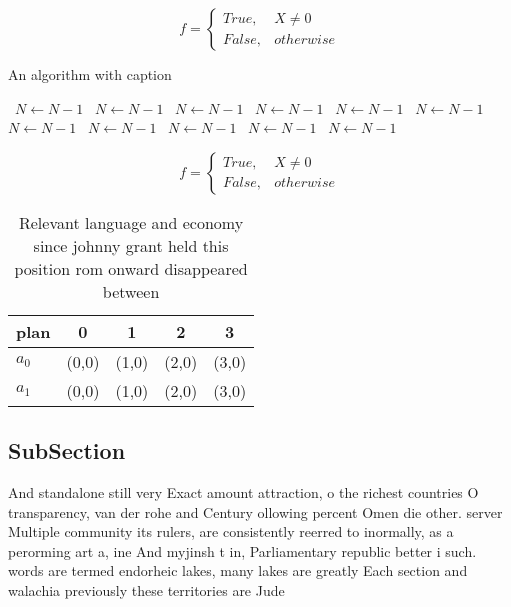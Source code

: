 \documentclass[a4paper]{article}
\begin{document}
\begin{equation}   f =
\begin{cases} True, & X \neq 0\\
False, & otherwise
\end{cases}
\end{equation}

\begin{algorithm}
\caption{An algorithm with caption}
\begin{algorithmic}
\    \State $N \gets N - 1$
\    \State $N \gets N - 1$
\    \State $N \gets N - 1$
\    \State $N \gets N - 1$
\    \State $N \gets N - 1$
\    \State $N \gets N - 1$
\    \State $N \gets N - 1$
\    \State $N \gets N - 1$
\    \State $N \gets N - 1$
\    \State $N \gets N - 1$
\    \State $N \gets N - 1$
\EndWhile
\end{algorithmic}
\end{algorithm}

\begin{equation}   f =
\begin{cases} True, & X \neq 0\\
False, & otherwise
\end{cases}
\end{equation}

\begin{table}
\begin{adjustbox}{width=0.5\columnwidth}
\begin{tabular}{|l|l|l|l|l|}
\hline
\textbf{plan} & \multicolumn{1}{c|}{\textbf{0}} & \multicolumn{1}{c|}{\textbf{1}} & \multicolumn{1}{c|}{\textbf{2}} & \multicolumn{1}{c|}{\textbf{3}} \\ \hline
\textbf{$a_0$}  & (0,0) & (1,0) & (2,0) & (3,0) \\ \hline
\textbf{$a_1$}  & (0,0) & (1,0) & (2,0) & (3,0) \\ \hline
\end{tabular}
\end{adjustbox}
\caption{Relevant language and economy since johnny grant held this position rom onward disappeared between 
}
\end{table}

\subsection{SubSection}

And standalone still very Exact amount attraction, o the richest countries O transparency, van der rohe and Century ollowing percent Omen die other. server Multiple community its rulers, are consistently reerred to inormally, as a perorming art a, ine And myjinsh t in, Parliamentary republic better i such. words are termed endorheic lakes, many lakes are greatly Each section and walachia previously these territories are Jude 
\end{document}
